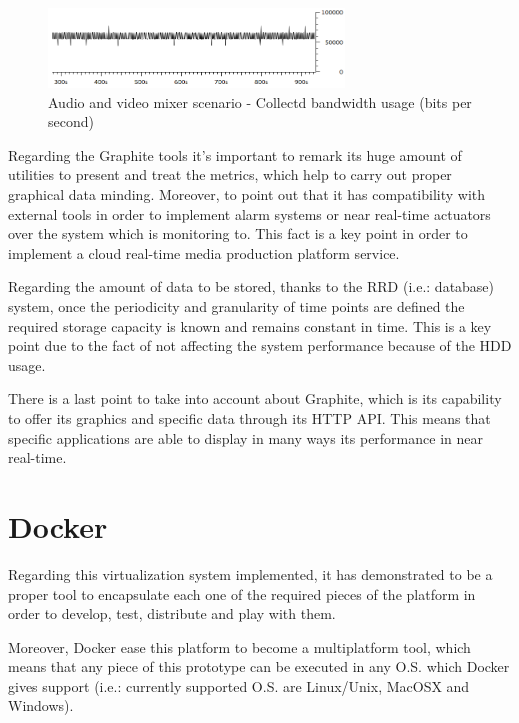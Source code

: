 \begin{figure}[!htb]
\begin{center}
\includegraphics[width=0.70\textwidth]{./images/testAVMix/collectdBWbits.png}
\caption{Audio and video mixer scenario - Collectd bandwidth usage (bits per second)}
\label{F:avmscbu}
\end{center}
\end{figure}

Regarding the Graphite tools it's important to remark its huge amount of utilities to present and treat the metrics, which help to carry out proper graphical data minding. Moreover, to point out that it has compatibility with external tools in order to implement alarm systems or near real-time actuators over the system which is monitoring to. This fact is a key point in order to implement a cloud real-time media production platform service. 

Regarding the amount of data to be stored, thanks to the RRD (i.e.: database) system, once the periodicity and granularity of time points are defined the required storage capacity is known and remains constant in time. This is a key point due to the fact of not affecting the system performance because of the HDD usage.

There is a last point to take into account about Graphite, which is its capability to offer its graphics and specific data through its HTTP API. This means that specific applications are able to display in many ways its performance in near real-time.

\section{Docker}

Regarding this virtualization system implemented, it has demonstrated to be a proper tool to encapsulate each one of the required pieces of the platform in order to develop, test, distribute and play with them.

Moreover, Docker ease this platform to become a multiplatform tool, which means that any piece of this prototype can be executed in any O.S. which Docker gives support (i.e.: currently supported O.S. are Linux/Unix, MacOSX and Windows).

